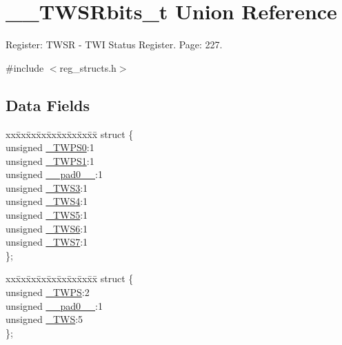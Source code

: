 \hypertarget{union_____t_w_s_rbits__t}{\section{\+\_\+\+\_\+\+T\+W\+S\+Rbits\+\_\+t Union Reference}
\label{union_____t_w_s_rbits__t}
}


Register\+: T\+W\+S\+R -\/ T\+W\+I Status Register. Page\+: 227.  




{\ttfamily \#include $<$reg\+\_\+structs.\+h$>$}

\subsection*{Data Fields}
\begin{DoxyCompactItemize}
\item 
\begin{tabbing}
xx\=xx\=xx\=xx\=xx\=xx\=xx\=xx\=xx\=\kill
struct \{\\
\>unsigned \hyperlink{union_____t_w_s_rbits__t_a29b3e5b90d3ce3c2da477f7e76a447fa}{\_TWPS0}:1\\
\>unsigned \hyperlink{union_____t_w_s_rbits__t_a89ed4e4513aa2a990fd7d2696932d960}{\_TWPS1}:1\\
\>unsigned \hyperlink{union_____t_w_s_rbits__t_a0bb0bf7a1c95e90db5870767f222fa24}{\_\_pad0\_\_}:1\\
\>unsigned \hyperlink{union_____t_w_s_rbits__t_a8115be1b7e8cdcc25482ae243c3b070a}{\_TWS3}:1\\
\>unsigned \hyperlink{union_____t_w_s_rbits__t_ace7166b90449f05c6f4f86643819d9cf}{\_TWS4}:1\\
\>unsigned \hyperlink{union_____t_w_s_rbits__t_ab34c2db57d3f428c4b2edc8afdba9af7}{\_TWS5}:1\\
\>unsigned \hyperlink{union_____t_w_s_rbits__t_aced71bd4f6ed3e667e9d958ae808e1ec}{\_TWS6}:1\\
\>unsigned \hyperlink{union_____t_w_s_rbits__t_a02d570d0d7b9b38d3ce547629d8c5597}{\_TWS7}:1\\
\}; \\

\end{tabbing}\item 
\begin{tabbing}
xx\=xx\=xx\=xx\=xx\=xx\=xx\=xx\=xx\=\kill
struct \{\\
\>unsigned \hyperlink{union_____t_w_s_rbits__t_afee5a81e9a9b2775177c090c345a2bfb}{\_TWPS}:2\\
\>unsigned \hyperlink{union_____t_w_s_rbits__t_a0bb0bf7a1c95e90db5870767f222fa24}{\_\_pad0\_\_}:1\\
\>unsigned \hyperlink{union_____t_w_s_rbits__t_afbb3a61de0c47a3a9097b4ccf84a0a8e}{\_TWS}:5\\
\}; \\


\end{tabbing}
\end{DoxyCompactItemize}
